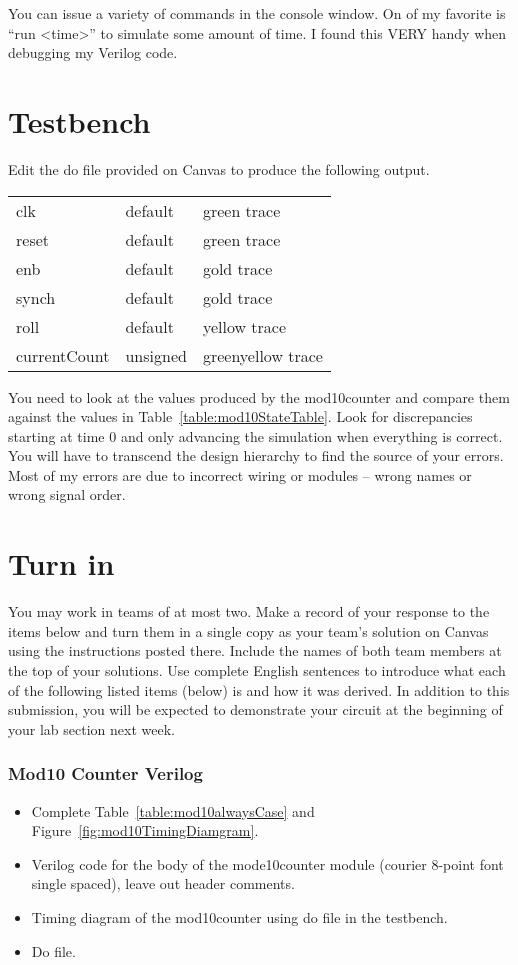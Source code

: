 You can issue a variety of commands in the console window. On of my
favorite is ``run \textless time\textgreater'' to simulate some amount
of time. I found this VERY handy when debugging my Verilog code.

\section{Testbench}

Edit the do file provided on Canvas to produce the following output.

\begin{tabular}{p{3cm}p{3cm}p{3cm}}
  clk 		& default 		& green trace \\ 
  reset 	& default 		& green trace \\ 
  enb 		& default 		& gold trace \\ 
  synch 	& default 		& gold trace \\ 
  roll 		& default 		& yellow trace \\ 
  currentCount 	& unsigned & greenyellow trace \\ 
\end{tabular}

You need to look at the values produced by the mod10counter and compare
them against the values in Table~\ref{table:mod10StateTable}. Look for discrepancies
starting at time 0 and only advancing the simulation when everything is
correct. You will have to transcend the design hierarchy to find the
source of your errors. Most of my errors are due to incorrect wiring or
modules -- wrong names or wrong signal order.


\section{Turn in}

You may work in teams of at most two. Make a record of your response to
the items below and turn them in a single copy as your team's solution
on Canvas using the instructions posted there. Include the names of both
team members at the top of your solutions. Use complete English
sentences to introduce what each of the following listed items (below)
is and how it was derived. In addition to this submission, you will be
expected to demonstrate your circuit at the beginning of your lab
section next week.

\subsubsection{Mod10 Counter Verilog}

\begin{itemize}
\item
  Complete Table~\ref{table:mod10alwaysCase} and Figure~\ref{fig:mod10TimingDiamgram}.
\item
  Verilog code for the body of the mode10counter module (courier 8-point
  font single spaced), leave out header comments.
\item
  Timing diagram of the mod10counter using do file in the testbench.
\item
  Do file.
\end{itemize}

